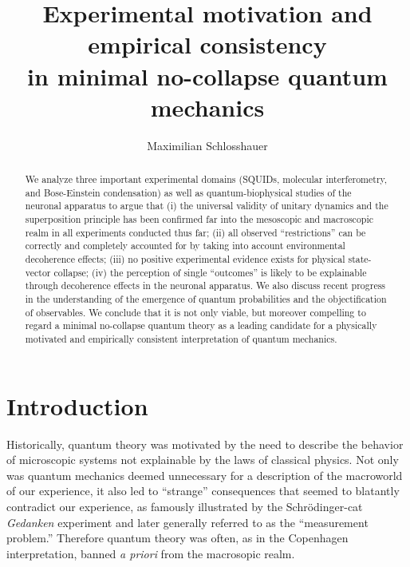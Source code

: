 \documentclass[12pt,aps,floatfix,amsmath,amssymb,showpacs,nofootinbib]{revtex4-2}
\begin{document}
\title{Experimental motivation and empirical consistency \\in minimal
  no-collapse quantum mechanics}

\author{Maximilian Schlosshauer}




\begin{abstract}
  
  We analyze three important experimental domains (SQUIDs, molecular
  interferometry, and Bose-Einstein condensation) as well as
  quantum-biophysical studies of the neuronal apparatus to argue that
  (i) the universal validity of unitary dynamics and the superposition
  principle has been confirmed far into the mesoscopic and macroscopic
  realm in all experiments conducted thus far; (ii) all observed
  ``restrictions'' can be correctly and completely accounted for by
  taking into account environmental decoherence effects; (iii) no
  positive experimental evidence exists for physical state-vector
  collapse; (iv) the perception of single ``outcomes'' is likely to be
  explainable through decoherence effects in the neuronal apparatus.
  We also discuss recent progress in the understanding of the
  emergence of quantum probabilities and the objectification of
  observables. We conclude that it is not only viable, but moreover
  compelling to regard a minimal no-collapse quantum theory as a
  leading candidate for a physically motivated and empirically
  consistent interpretation of quantum mechanics.

\end{abstract}

\maketitle


\section{Introduction}

Historically, quantum theory was motivated by the need to describe the
behavior of microscopic systems not explainable by the laws of
classical physics. Not only was quantum mechanics deemed unnecessary
for a description of the macroworld of our experience, it also led to
``strange'' consequences that seemed to blatantly contradict our
experience, as famously illustrated by the Schr\"odinger-cat {\em
  Gedanken} experiment \cite{Schrodinger:1935:gs} and later generally
referred to as the ``measurement problem.'' Therefore quantum theory
was often, as in the Copenhagen interpretation, banned {\em a priori}
from the macrosopic realm.
\end{document}
